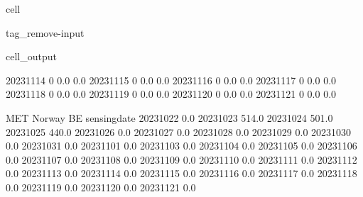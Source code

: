 \documentclass[letterpaper,10pt,english]{jupyterBook}
\begin{document}
\begin{sphinxuseclass}{cell}
\begin{sphinxuseclass}{tag_remove-input}
\begin{sphinxVerbatimOutput}
\begin{sphinxuseclass}{cell_output}
\begin{sphinxVerbatim}[commandchars=\\\{\}]
2023\PYGZhy{}11\PYGZhy{}14                0                    0.0                    0.0   
2023\PYGZhy{}11\PYGZhy{}15                0                    0.0                    0.0   
2023\PYGZhy{}11\PYGZhy{}16                0                    0.0                    0.0   
2023\PYGZhy{}11\PYGZhy{}17                0                    0.0                    0.0   
2023\PYGZhy{}11\PYGZhy{}18                0                    0.0                    0.0   
2023\PYGZhy{}11\PYGZhy{}19                0                    0.0                    0.0   
2023\PYGZhy{}11\PYGZhy{}20                0                    0.0                    0.0   
2023\PYGZhy{}11\PYGZhy{}21                0                    0.0                    0.0   

              MET Norway BE  
sensing\PYGZus{}date                 
2023\PYGZhy{}10\PYGZhy{}22              0.0  
2023\PYGZhy{}10\PYGZhy{}23            514.0  
2023\PYGZhy{}10\PYGZhy{}24            501.0  
2023\PYGZhy{}10\PYGZhy{}25            440.0  
2023\PYGZhy{}10\PYGZhy{}26              0.0  
2023\PYGZhy{}10\PYGZhy{}27              0.0  
2023\PYGZhy{}10\PYGZhy{}28              0.0  
2023\PYGZhy{}10\PYGZhy{}29              0.0  
2023\PYGZhy{}10\PYGZhy{}30              0.0  
2023\PYGZhy{}10\PYGZhy{}31              0.0  
2023\PYGZhy{}11\PYGZhy{}01              0.0  
2023\PYGZhy{}11\PYGZhy{}03              0.0  
2023\PYGZhy{}11\PYGZhy{}04              0.0  
2023\PYGZhy{}11\PYGZhy{}05              0.0  
2023\PYGZhy{}11\PYGZhy{}06              0.0  
2023\PYGZhy{}11\PYGZhy{}07              0.0  
2023\PYGZhy{}11\PYGZhy{}08              0.0  
2023\PYGZhy{}11\PYGZhy{}09              0.0  
2023\PYGZhy{}11\PYGZhy{}10              0.0  
2023\PYGZhy{}11\PYGZhy{}11              0.0  
2023\PYGZhy{}11\PYGZhy{}12              0.0  
2023\PYGZhy{}11\PYGZhy{}13              0.0  
2023\PYGZhy{}11\PYGZhy{}14              0.0  
2023\PYGZhy{}11\PYGZhy{}15              0.0  
2023\PYGZhy{}11\PYGZhy{}16              0.0  
2023\PYGZhy{}11\PYGZhy{}17              0.0  
2023\PYGZhy{}11\PYGZhy{}18              0.0  
2023\PYGZhy{}11\PYGZhy{}19              0.0  
2023\PYGZhy{}11\PYGZhy{}20              0.0  
2023\PYGZhy{}11\PYGZhy{}21              0.0  
\end{sphinxVerbatim}

\end{sphinxuseclass}\end{sphinxVerbatimOutput}

\end{sphinxuseclass}
\end{sphinxuseclass}
\end{document}
